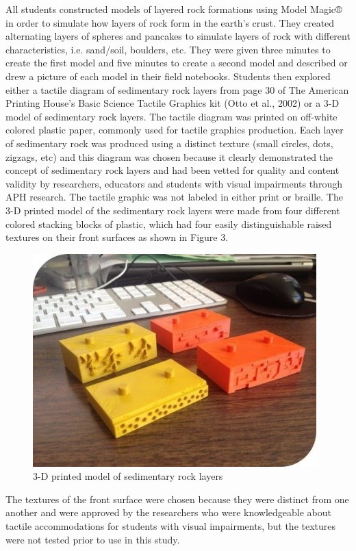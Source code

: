 \documentclass[11.5pt]{sig-alternate} %
\begin{document}
\begin{large}
All students constructed models of layered rock formations using Model Magic® in order to simulate how layers of rock form in the earth’s crust.  They created alternating layers of spheres and pancakes to simulate layers of rock with different characteristics, i.e. sand/soil, boulders, etc.  They were given three minutes to create the first model and five minutes to create a second model and described or drew a picture of each model in their field notebooks.  Students then explored either a tactile diagram of sedimentary rock layers from page 30 of The American Printing House’s Basic Science Tactile Graphics kit (Otto et al., 2002) or a 3-D model of sedimentary rock layers.  The tactile diagram was printed on off-white colored plastic paper, commonly used for tactile graphics production.  Each layer of sedimentary rock was produced using a distinct texture (small circles, dots, zigzags, etc) and this diagram was chosen because it clearly demonstrated the concept of sedimentary rock layers and had been vetted for quality and content validity by researchers, educators and students with visual impairments through APH research.  The tactile graphic was not labeled in either print or braille.  The 3-D printed model of the sedimentary rock layers were made from four different colored stacking blocks of plastic, which had four easily distinguishable raised textures on their front surfaces as shown in Figure 3.
  
\begin{figure}[h]
     \centering
     \includegraphics{images/fig3.jpg}
     \caption{3-D printed model of sedimentary rock layers}
 \end{figure} 
 
The textures of the front surface were chosen because they were distinct from one another and were approved by the researchers who were knowledgeable about tactile accommodations for students with visual impairments, but the textures were not tested prior to use in this study. 


\end{large}
\end{document}
